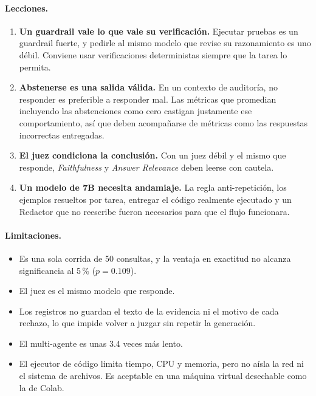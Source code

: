 \paragraph{Lecciones.}
\begin{enumerate}
  \item \textbf{Un guardrail vale lo que vale su verificación.} Ejecutar pruebas es un guardrail fuerte, y pedirle al mismo modelo que revise su razonamiento es uno débil.
  Conviene usar verificaciones deterministas siempre que la tarea lo permita.
  \item \textbf{Abstenerse es una salida válida.} En un contexto de auditoría, no responder es preferible a responder mal.
  Las métricas que promedian incluyendo las abstenciones como cero castigan justamente ese comportamiento, así que deben acompañarse de métricas como las respuestas incorrectas entregadas.
  \item \textbf{El juez condiciona la conclusión.} Con un juez débil y el mismo que responde, \emph{Faithfulness} y \emph{Answer Relevance} deben leerse con cautela.
  \item \textbf{Un modelo de 7B necesita andamiaje.} La regla anti-repetición, los ejemplos resueltos por tarea, entregar el código realmente ejecutado y un Redactor que no reescribe fueron necesarios para que el flujo funcionara.
\end{enumerate}

\paragraph{Limitaciones.}
\begin{itemize}
  \item Es una sola corrida de 50 consultas, y la ventaja en exactitud no alcanza significancia al 5\,\% ($p = 0.109$).
  \item El juez es el mismo modelo que responde.
  \item Los registros no guardan el texto de la evidencia ni el motivo de cada rechazo, lo que impide volver a juzgar sin repetir la generación.
  \item El multi-agente es unas 3.4 veces más lento.
  \item El ejecutor de código limita tiempo, CPU y memoria, pero no aísla la red ni el sistema de archivos. Es aceptable en una máquina virtual desechable como la de Colab.
\end{itemize}

